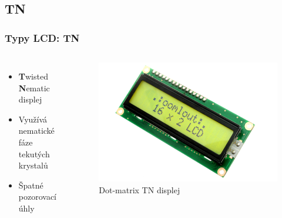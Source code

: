 \documentclass[aspectratio=169,11pt, allowframebreak=0.9]{beamer}
\begin{document}
\subsection{TN}
\begin{frame}
\frametitle{Typy LCD: TN}
\begin{columns}
\begin{itemize}
    \item \textbf{T}wisted \textbf{N}ematic displej
    \item Využívá nematické fáze tekutých krystalů
    \item Špatné pozorovací úhly
\end{itemize}
\begin{figure}
    \centering
    \includegraphics[width=1\textwidth]{dm.jpg}
    \caption{Dot-matrix TN displej}
\end{figure}
\end{columns}
\end{frame}
\end{document}
